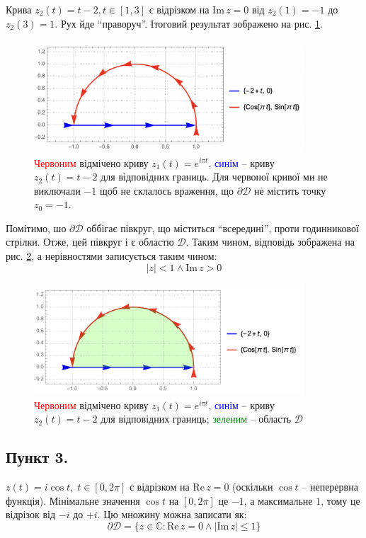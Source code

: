 \documentclass[14pt]{extarticle}
\begin{document}
Крива $z_2(t)=t-2, t \in [1,3]$ є відрізком на $\text{Im}\, z = 0$ від $z_2(1)=-1$ до $z_2(3)=1$. Рух йде ``праворуч''. Ітоговий результат зображено на рис. \ref{fig:1_2_1}.

\begin{figure}[H]
    \centering
    \includegraphics[width=0.9\textwidth]{images/hw_2/hw_2_1_2(1).png}
    \caption{\textcolor{red}{Червоним} відмічено криву $z_1(t)=e^{i\pi t}$, \textcolor{blue}{синім} -- криву $z_2(t)=t-2$ для відповідних границь. Для червоної кривої ми не виключали $-1$ щоб не склалось враження, що $\partial\mathcal{D}$ не містить точку $z_0=-1$.}
    \label{fig:1_2_1}
\end{figure}

Помітимо, шо $\partial\mathcal{D}$ оббігає півкруг, що міститься ``всередині'', проти годинникової стрілки. Отже, цей півкруг і є областю $\mathcal{D}$. Таким чином, відповідь зображена на рис. \ref{fig:1_2_2}, а нерівностями записується таким чином:
\[
|z| < 1 \wedge \text{Im} \, z > 0
\]

\begin{figure}[H]
    \centering
    \includegraphics[width=0.9\textwidth]{images/hw_2/hw_2_1_2(2).png}
    \caption{\textcolor{red}{Червоним} відмічено криву $z_1(t)=e^{i\pi t}$, \textcolor{blue}{синім} -- криву $z_2(t)=t-2$ для відповідних границь; \textcolor{green}{зеленим} -- область $\mathcal{D}$}
    \label{fig:1_2_2}
\end{figure}

\subsection*{Пункт 3.}
$z(t)=i \cos t, \; t \in [0,2\pi]$ є відрізком на $\text{Re}\, z = 0$ (оскільки $\cos t$ -- неперервна функція). Мінімальне значення $\cos t$ на $[0,2\pi]$ це $-1$, а максимальне $1$, тому це відрізок від $-i$ до $+i$. Цю множину можна записати як:
\[
\partial\mathcal{D} = \{z \in \mathbb{C}: \text{Re}\, z = 0 \wedge |\text{Im}\, z| \leq 1\}
\]
\end{document}
